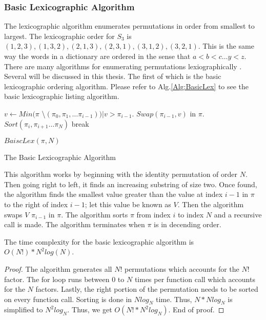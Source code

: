 \subsubsection{Basic Lexicographic Algorithm}
The lexicographic algorithm enumerates permutations in order from smallest to 
largest. The lexicographic order for $S_{3}$ is $(1,2,3),(1,3,2),(2,1,3),(2,3,1),(3,1,2),(3,2,1)$.
This is the same way the words in a dictionary are ordered in the sense that $a < b < c \dots y < z$.
There are many algorithms for enumerating permutations lexiographically \cite{A19, A20, A21, A22, A23}. 
Several will be discussed in this thesis. The first of which is the basic lexicographic ordering algorithm.
Please refer to Alg.\ref{Alg:BasicLex} to see the basic lexicographic listing algorithm.\pagebreak
\begin{algorithm}
    \begin{algorithmic}[1]
                    \State $v \gets Min(\pi$ \textbackslash $(\pi_{0},\pi_{1}, \dots \pi_{i-1})) | v > \pi_{i-1}$.
                    \State $Swap(\pi_{i-1}, v)$ in $\pi$.
                    \State $Sort(\pi_{i},\pi_{i+1} \dots \pi_{N})$
                    \State break
                   
                \EndIf
            \EndFor
            \State $BaiscLex(\pi, N)$

        \EndFunction
        
    \end{algorithmic}
    \caption{The Basic Lexicographic Algorithm}
    \label{Alg:BasicLex}
\end{algorithm}
This algorithm works by beginning with the identity permutation of order $N$. Then going right to left, 
it finds an increasing substring of size two. Once found, the algorithm finds the smallest value greater than the 
value at index $i-1$ in $\pi$ to the right of index $i-1$; let this value be known as $V$. 
Then the algorithm swaps $V$ $\pi_{i-1}$ in $\pi$. The algorithm sorts $\pi$ from index $i$ to index $N$ and a recursive call is made.
The algorithm terminates when $\pi$ is in decending order.\par
\begin{lemma}
    The time complexity for the basic lexicographic algorithm is $O(N!)*N^{2}log(N)$.
\end{lemma}
\begin{proof}
    The algorithm generates all $N!$ permutations which accounts for the $N!$ factor. The for loop runs between 
    $0$ to $N$ times per function call which accounts for the $N$ factors. Lastly, the right portion of the permutation 
    needs to be sorted on every function call. Sorting is done in $Nlog_{N}$ time. Thus, $N*Nlog_{N}$ is simplified to 
    $N^{2}log_{N}$. Thus, we get $O(N!*N^{2}log_{N})$. End of proof.
\end{proof}


